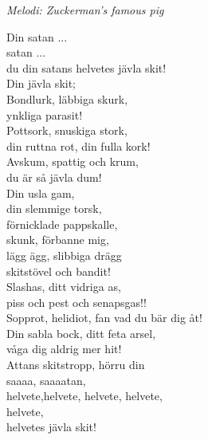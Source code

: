 {\footnotesize\textit{Melodi: Zuckerman's famous pig}}\par
\vspace{10pt}
Din satan ...\\
satan ...\\
du din satans helvetes jävla skit!\\
Din jävla skit;\\
Bondlurk, läbbiga skurk,\\
ynkliga parasit!\\
Pottsork, snuskiga stork,\\
din ruttna rot, din fulla kork!\\
Avskum, spattig och krum, \\
du är så jävla dum!\\
Din usla gam,\\
din slemmige torsk,\\
förnicklade pappskalle,\\
skunk, förbanne mig,\\
lägg ägg, slibbiga drägg\\
skitstövel och bandit!\\
Slashas, ditt vidriga as,\\
piss och pest och senapsgas!!\\
Sopprot, helidiot, fan vad du bär dig åt!\\
Din sabla bock, ditt feta arsel,\\
våga dig aldrig mer hit!\\
Attans skitstropp, hörru din\\
saaaa, saaaatan,\\
helvete,helvete, helvete, helvete,\\
helvete,\\
helvetes jävla skit!
